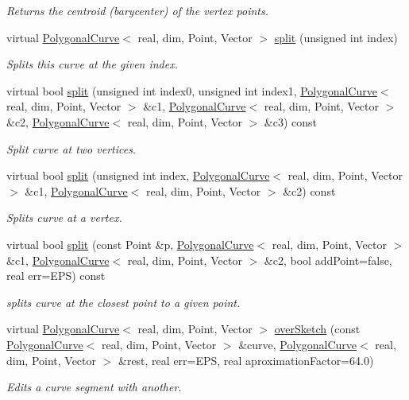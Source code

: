 \begin{DoxyCompactItemize}
\begin{DoxyCompactList}\small\item\em Returns the centroid (barycenter) of the vertex points. \end{DoxyCompactList}\item 
virtual \hyperlink{classPolygonalCurve}{PolygonalCurve}$<$ real, dim, Point, Vector $>$ \hyperlink{classPolygonalCurve_a4ce2b915a36a41d0c1ab0defcde023d2}{split} (unsigned int index)
\begin{DoxyCompactList}\small\item\em Splits this curve at the given index. \end{DoxyCompactList}\item 
virtual bool \hyperlink{classPolygonalCurve_a872b174f6b1054f529eb18dfac547f63}{split} (unsigned int index0, unsigned int index1, \hyperlink{classPolygonalCurve}{PolygonalCurve}$<$ real, dim, Point, Vector $>$ \&c1, \hyperlink{classPolygonalCurve}{PolygonalCurve}$<$ real, dim, Point, Vector $>$ \&c2, \hyperlink{classPolygonalCurve}{PolygonalCurve}$<$ real, dim, Point, Vector $>$ \&c3) const 
\begin{DoxyCompactList}\small\item\em Split curve at two vertices. \end{DoxyCompactList}\item 
virtual bool \hyperlink{classPolygonalCurve_acdbdc7f170629e0a11aeec55cabc1115}{split} (unsigned int index, \hyperlink{classPolygonalCurve}{PolygonalCurve}$<$ real, dim, Point, Vector $>$ \&c1, \hyperlink{classPolygonalCurve}{PolygonalCurve}$<$ real, dim, Point, Vector $>$ \&c2) const 
\begin{DoxyCompactList}\small\item\em Splits curve at a vertex. \end{DoxyCompactList}\item 
virtual bool \hyperlink{classPolygonalCurve_acdf34f1bcfd5a8e1a56ff56db3ab2b27}{split} (const Point \&p, \hyperlink{classPolygonalCurve}{PolygonalCurve}$<$ real, dim, Point, Vector $>$ \&c1, \hyperlink{classPolygonalCurve}{PolygonalCurve}$<$ real, dim, Point, Vector $>$ \&c2, bool addPoint=false, real err=EPS) const 
\begin{DoxyCompactList}\small\item\em splits curve at the closest point to a given point. \end{DoxyCompactList}\item 
virtual \hyperlink{classPolygonalCurve}{PolygonalCurve}$<$ real, dim, Point, Vector $>$ \hyperlink{classPolygonalCurve_a750c814171749bb3fa4f5e65d0c2c5bc}{overSketch} (const \hyperlink{classPolygonalCurve}{PolygonalCurve}$<$ real, dim, Point, Vector $>$ \&curve, \hyperlink{classPolygonalCurve}{PolygonalCurve}$<$ real, dim, Point, Vector $>$ \&rest, real err=EPS, real aproximationFactor=64.0)
\begin{DoxyCompactList}\small\item\em Edits a curve segment with another. \end{DoxyCompactList}\end{DoxyCompactItemize}
